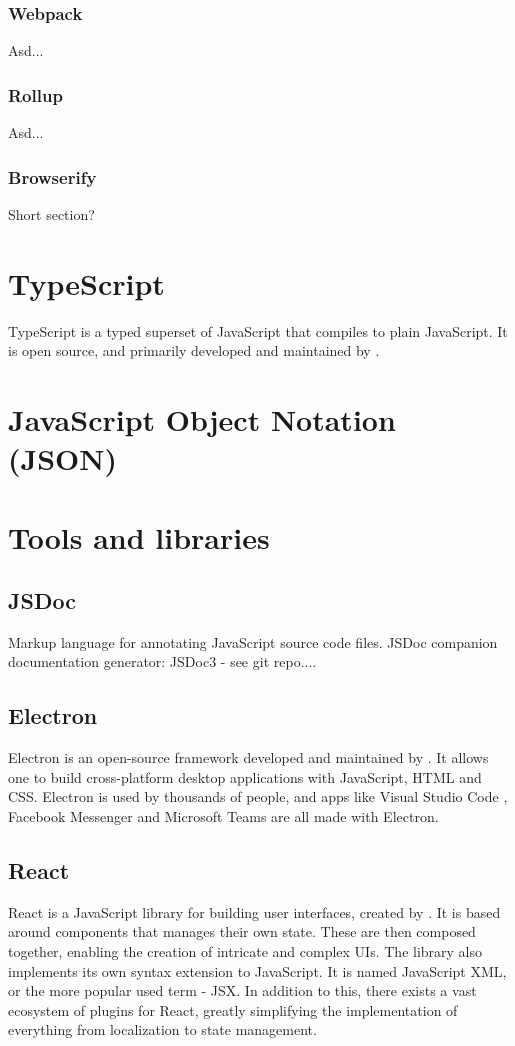 \subsubsection{Webpack}
Asd...
\subsubsection{Rollup}
Asd...
\subsubsection{Browserify}
Short section?

\section{TypeScript}
TypeScript is a typed superset of JavaScript that compiles to plain JavaScript. It is open source, and primarily developed and maintained by \cite{microsoft}.

\section{JavaScript Object Notation (JSON)}

\section{Tools and libraries}
\subsection{JSDoc}
Markup language for annotating JavaScript source code files.
JSDoc companion documentation generator: JSDoc3 - see git repo....

\subsection{Electron}
Electron \cite{electron} is an open-source framework developed and maintained by \citet{github}. It allows one to build cross-platform desktop applications with JavaScript, HTML and CSS. Electron is used by thousands of people, and apps like Visual Studio Code \cite{visual-studio-code}, Facebook Messenger \cite{messenger} and Microsoft Teams \cite{teams} are all made with Electron.

\subsection{React}
React \cite{react} is a JavaScript library for building user interfaces, created by \citet{facebook}. It is based around components that manages their own state. These are then composed together, enabling the creation of intricate and complex UIs. The library also implements its own syntax extension to JavaScript. It is named JavaScript XML, or the more popular used term - JSX. In addition to this, there exists a vast ecosystem of plugins for React, greatly simplifying the implementation of everything from localization to state management.

